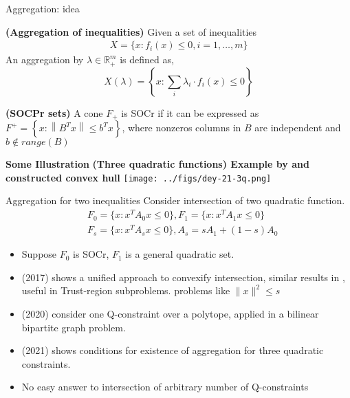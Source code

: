 \documentclass[aspectratio=1610, 10pt]{beamer}
\begin{document}
\begin{frame}[allowframebreaks]{Aggregation: idea}
  \begin{definition}
    \textbf{(Aggregation of inequalities)} Given a set of inequalities
    \begin{align*}
      X = \{x : f_i (x) \le 0, i = 1, \ldots, m\}
    \end{align*}
    An aggregation by \(\lambda \in \mathbb R^m_+\) is defined as,
    \begin{equation}
      X(\lambda) = \left\{x: \sum_i \lambda_i \cdot f_i (x) \le 0\right\}
    \end{equation}

  \end{definition}
  \begin{definition}
    \textbf{(SOCPr sets)} A cone \(F_+\) is SOCr if it can be expressed as \(F^{+}=\left\{x:\left\|B^{T} x\right\| \leq b^{T} x\right\}\), where nonzeros columns in \(B\) are independent and \(b\notin range(B)\)
  \end{definition}

  \textbf{Some Illustration}
  \textbf{(Three quadratic functions) Example by \cite{dey_obtaining_2021} and constructed convex hull}
  \texttt{[image: ../figs/dey-21-3q.png]}

\end{frame}
\begin{frame}{Aggregation for two inequalities}
  Consider intersection of two quadratic function.
  \begin{align*}
     & F_0 = \{x : x^T A_0 x \le 0\}, F_1 = \{x : x^T A_1 x \le 0\} \\
     & F_s = \{x : x^T A_s x \le 0\}, A_s = sA_1 + (1 - s) A_0
  \end{align*}
  \begin{itemize}
    \item Suppose \(F_0\) is SOCr, \(F_1\) is a general quadratic set.
    \item (2017) \cite{burer_how_2017} shows a unified approach to convexify intersection, similar results in \cite{modaresi_convex_2017}, useful in Trust-region subproblems. problems like \(\|x\|^2 \le s\)
    \item (2020) \cite{santana_convex_2020} consider one Q-constraint over a polytope, applied in a bilinear bipartite graph problem.
    \item (2021) \cite{dey_obtaining_2021} shows conditions for existence of aggregation for three quadratic constraints.
    \item No easy answer to intersection of arbitrary number of Q-constraints
  \end{itemize}
\end{frame}
\end{document}
